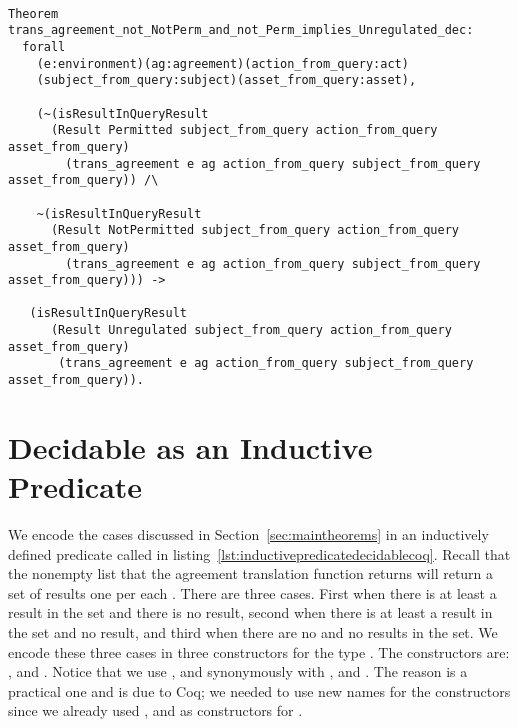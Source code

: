 \begin{minipage}[c]{0.95\textwidth}
\begin{lstlisting}

Theorem trans_agreement_not_NotPerm_and_not_Perm_implies_Unregulated_dec:
  forall
    (e:environment)(ag:agreement)(action_from_query:act)
    (subject_from_query:subject)(asset_from_query:asset),

    (~(isResultInQueryResult 
      (Result Permitted subject_from_query action_from_query asset_from_query)
        (trans_agreement e ag action_from_query subject_from_query asset_from_query)) /\

    ~(isResultInQueryResult 
      (Result NotPermitted subject_from_query action_from_query asset_from_query)
        (trans_agreement e ag action_from_query subject_from_query asset_from_query))) ->

   (isResultInQueryResult 
      (Result Unregulated subject_from_query action_from_query asset_from_query)
       (trans_agreement e ag action_from_query subject_from_query asset_from_query)).
\end{lstlisting}
\end{minipage}


\section{Decidable as an Inductive Predicate}

We encode the cases discussed in Section~\ref{sec:maintheorems} in an inductively defined predicate called  in listing~\ref{lst:inductivepredicatedecidablecoq}. Recall that the nonempty list that the agreement translation function  returns will return a set of results one per each . There are three cases. First when there is at least a  result in the set and there is no  result, second when there is at least a  result in the set and no  result, and third when there are no  and no  results in the set. We encode these three cases in three constructors for the type . The constructors are: ,  and . Notice that we use ,  and  synonymously with ,  and . The reason is a practical one and is due to Coq; we needed to use new names for the  constructors since we already used ,  and  as constructors for . 

